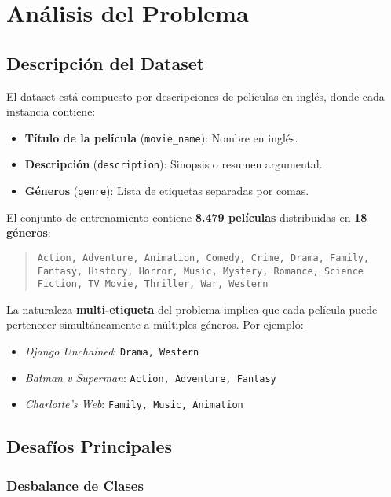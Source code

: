 \section{Análisis del Problema}\label{sec:analisis}

\subsection{Descripción del Dataset}

El dataset está compuesto por descripciones de películas en inglés, donde cada instancia contiene:
\begin{itemize}
    \item \textbf{Título de la película} (\texttt{movie\_name}): Nombre en inglés.
    \item \textbf{Descripción} (\texttt{description}): Sinopsis o resumen argumental.
    \item \textbf{Géneros} (\texttt{genre}): Lista de etiquetas separadas por comas.
\end{itemize}

El conjunto de entrenamiento contiene \textbf{8.479 películas} distribuidas en \textbf{18 géneros}:
\begin{quote}
\texttt{Action, Adventure, Animation, Comedy, Crime, Drama, Family, Fantasy, History, Horror, Music, Mystery, Romance, Science Fiction, TV Movie, Thriller, War, Western}
\end{quote}

La naturaleza \textbf{multi-etiqueta} del problema implica que cada película puede pertenecer simultáneamente a múltiples géneros. Por ejemplo:
\begin{itemize}
    \item \emph{Django Unchained}: \texttt{Drama, Western}
    \item \emph{Batman v Superman}: \texttt{Action, Adventure, Fantasy}
    \item \emph{Charlotte's Web}: \texttt{Family, Music, Animation}
\end{itemize}

\subsection{Desafíos Principales}

\subsubsection{Desbalance de Clases}

